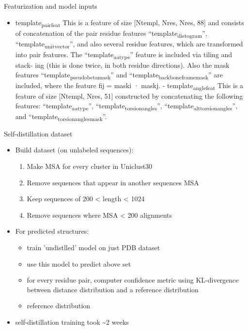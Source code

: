 \documentclass[presentation, smaller]{beamer}
\begin{document}
\begin{frame}[label={sec:org7e6b480}]{Featurization and model inputs \cite{jumperHighlyAccurateProtein2021}}
\begin{itemize}
\item \alert{template\textsubscript{pair}\textsubscript{feat}}
This is a feature of size [Ntempl, Nres, Nres, 88] and consists of concatenation of the pair residue features “template\textsubscript{distogram}”, “template\textsubscript{unit}\textsubscript{vector}”, and also several residue features, which are transformed into pair features. The “template\textsubscript{aatype}” feature is included via tiling and stack- ing (this is done twice, in both residue directions). Also the mask features “template\textsubscript{pseudo}\textsubscript{beta}\textsubscript{mask}” and “template\textsubscript{backbone}\textsubscript{frame}\textsubscript{mask}” are included, where the feature fij = maski · maskj. - template\textsubscript{angle}\textsubscript{feat} This is a feature of size [Ntempl, Nres, 51] constructed by concatenating the following features: “template\textsubscript{aatype}”, “template\textsubscript{torsion}\textsubscript{angles}”, “template\textsubscript{alt}\textsubscript{torsion}\textsubscript{angles}”, and “template\textsubscript{torsion}\textsubscript{angles}\textsubscript{mask}”.
\end{itemize}
\end{frame}

\begin{frame}[label={sec:org372eecf}]{Self-distillation dataset \cite{jumperHighlyAccurateProtein2021}}
\begin{itemize}
\item Build dataset (on unlabeled sequences):
\begin{enumerate}
\item Make MSA for every cluster in Uniclust30
\item Remove sequences that appear in another sequences MSA
\item Keep sequences of 200 < length < 1024
\item Remove sequences where MSA < 200 alignments
\end{enumerate}
\item For predicted structures:
\begin{itemize}
\item train 'undistlled' model on just PDB dataset
\item use this model to predict above set
\item for every residue pair, computer confidence metric using KL-divergence between distance distribution and a reference distribution
\item reference distribution
\end{itemize}
\item self-distillation training took \textasciitilde{}2 weeks
\end{itemize}
\end{frame}
\end{document}
